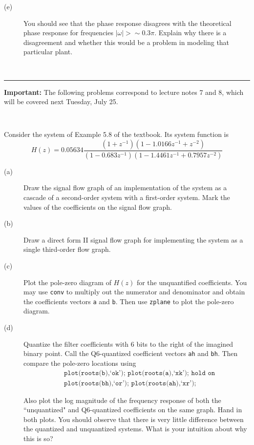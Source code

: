 \documentclass[12pt]{report}
\begin{document}
\begin{description}
	\item[(e)] You should see that the phase response disagrees with the theoretical phase response for frequencies $|\omega| > \sim 0.3\pi$. Explain why there is a disagreement and whether this would be a problem in modeling that particular plant. 
\end{description}

\mbox{}\\
\rule{6.5 in}{0.5pt}
\textbf{Important:} The following problems correspond to lecture notes 7 and 8, which will be covered next Tuesday, July 25.

\mbox{}\\

Consider the system of Example 5.8 of the textbook. Its system function is
\begin{equation}
H(z) = 0.05634\frac{(1+z^{-1})(1 -1.0166z^{-1} + z^{-2})}{(1-0.683z^{-1})(1 -1.4461z^{-1} + 0.7957z^{-2})}
\end{equation}

\begin{description}
	\item[(a)] Draw the signal flow graph of an implementation of the system as a cascade of a second-order system with a first-order system. Mark the values of the coefficients on the signal flow graph.
	\item[(b)] Draw a direct form II signal flow graph for implementing the system as a single third-order flow graph. 
	\item[(c)] Plot the pole-zero diagram of $H(z)$ for the unquantified coefficients. You may use \texttt{conv} to multiply out the numerator and denominator and obtain the coefficients vectors \texttt{a} and \texttt{b}. Then use \texttt{zplane} to plot the pole-zero diagram.
	\item[(d)] Quantize the filter coefficients with 6 bits to the right of the imagined binary point. Call the Q6-quantized coefficient vectors \texttt{ah} and \texttt{bh}. Then compare the pole-zero locations using
	\begin{align*}
		&\texttt{plot(roots(b),`ok');~plot(roots(a),`xk'); hold on} \\
		&\texttt{plot(roots(bh),`or');~plot(roots(ah),`xr');}
	\end{align*}
	
	Also plot the log magnitude of the frequency response of both the ``unquantized" and Q6-quantized coefficients on the same graph. Hand in both plots. You should observe that there is very little difference between the quantized and unquantized systems. What is your intuition about why this is so?
	
\end{description}
\end{document}
